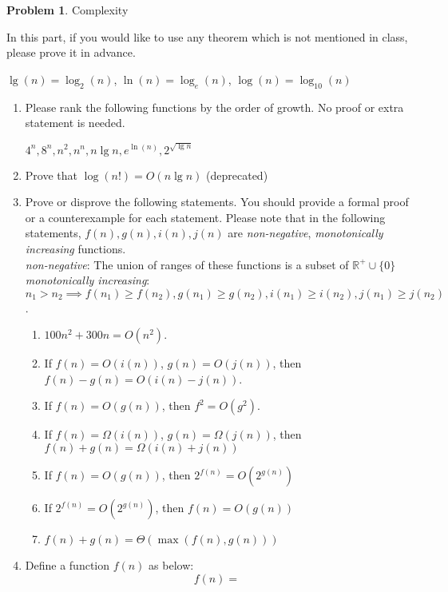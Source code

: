 \documentclass[12pt,a4paper]{report}
\theoremstyle{definition}
\newtheorem{problem}{\textbf{Problem}}
\theoremstyle{definition}
\begin{document}
\begin{problem}Complexity

In this part, if you would like to use any theorem which is not mentioned in class, please prove it in advance.
\begin{center}
$\lg(n) = \log_2(n)$, $\ln(n) = \log_e(n)$, $\log(n) = \log_{10}(n)$
\end{center}

\begin{enumerate}[label=\arabic*.]
\item Please rank the following functions by the order of growth. No proof or extra statement is needed.
    \begin{center}$4^n, 8^n, n^2, n^n, n\lg n, e^{\ln(n)}, 2^{\sqrt{\lg n}}$\end{center}
\item Prove that $\log(n!) = O(n\lg n)$ (deprecated)
\item Prove or disprove the following statements. You should provide a formal proof or a counterexample for each statement. Please note that in the following statements, $f(n), g(n), i(n), j(n)$ are \textit{non-negative}, \textit{monotonically increasing} functions.\\
\textit{non-negative}: The union of ranges of these functions is a subset of $\mathbb{R}^+\cup\{0\}$\\
\textit{monotonically increasing}:\\ $n_1>n_2 \implies f(n_1)\geq f(n_2), g(n_1)\geq g(n_2), i(n_1)\geq i(n_2), j(n_1)\geq j(n_2)$.
    \begin{enumerate}[label=\alph*.]
    \item $100n^2+300n = O(n^2)$.
    \item If $f(n) = O(i(n))$, $g(n) = O(j(n))$, then $f(n) - g(n) = O(i(n) - j(n))$.
    \item If $f(n) = O(g(n))$, then $f^2 = O(g^2)$.
    \item If $f(n) = \Omega(i(n))$, $g(n) = \Omega(j(n))$, then $f(n) + g(n) = \Omega(i(n) + j(n))$
    \item If $f(n) = O(g(n))$, then $2^{f(n)} = O(2^{g(n)})$
    \item If $2^{f(n)} = O(2^{g(n)})$, then $f(n) = O(g(n))$
    \item $f(n) + g(n) = \Theta(\max(f(n), g(n)))$
    \end{enumerate}
\item Define a function $f(n)$ as below:
    \begin{equation*}
    f(n) = 

\end{equation*}
\end{enumerate}
\end{problem}
\end{document}
